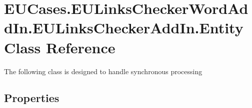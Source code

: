 \hypertarget{class_e_u_cases_1_1_e_u_links_checker_word_add_in_1_1_e_u_links_checker_add_in_1_1_entity}{\section{E\+U\+Cases.\+E\+U\+Links\+Checker\+Word\+Add\+In.\+E\+U\+Links\+Checker\+Add\+In.\+Entity Class Reference}
\label{class_e_u_cases_1_1_e_u_links_checker_word_add_in_1_1_e_u_links_checker_add_in_1_1_entity}
}


The following class is designed to handle synchronous processing  


\subsection*{Properties}
